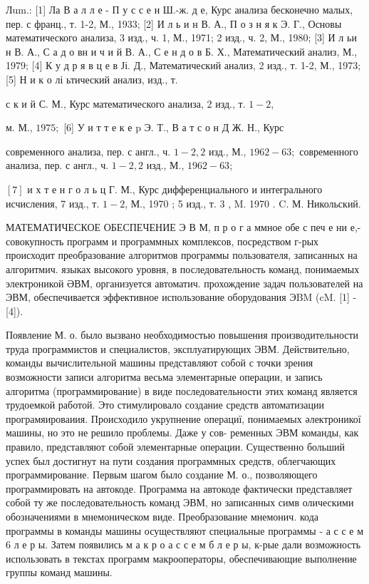 \documentclass[10pt]{article}
\begin{document}
Лum.: [1] Ла В а л л е - П у с с е н Ш.-ж. д е, Курс анализа бесконечно малых, пер. с франц., т. 1-2, М., 1933; [2] И л ь и н В. А., П о з н я к Э. Г., Основы математического анализа, 3 изд., ч. 1, М., 1971; 2 изд., ч. 2, М., 1980; [3] И л ьи н В. А., С а д о вн и ч и й В. А., С е н д о в Б. Х., Математический анализ, М., 1979; [4] К у д р я в ц е в Јі. Д., Математический анализ, 2 изд., т. 1-2, М., 1973; [5] Н и к о лі ьтический анализ, изд., т.

с к и й С. М., Курс математического анализа, 2 изд., т. $1-2$,

м. М., $1975 ;$ [6] У и т т е к е p Э. Т., В а т с о н Д Ж. Н., Курс

современного анализа, пер. с англ., ч. $1-2,2$ изд., М., $1962-63 ;$ современного анализа, пер. с англ., ч. $1-2,2$ изд., М., $1962-63$;

$[7]$ и х т е н г о л ь ц Г. М., Курс дифференциального и интегрального исчисления, 7 изд., т. $1-2$, М., 1970 ; 5 изд., т. 3 , M. 1970 . C. М. Никольский.



МАТЕМАТИЧЕСКОЕ ОБЕСПЕЧЕНИЕ Э В М, п р о г а ммное обе с печ е ни е,- совокупность программ и программных комплексов, посредством г-рых происходит преобразование алгоритмов программы пользователя, записанных на алгоритмич. языках высокого уровня, в последовательность команд, понимаемых электроникой ӘВМ, организуется автоматич. прохождение задач пользователей на ЭВМ, обеспечивается эффективное использование оборудования ЭBM (cM. [1] - [4]).



Появление М. о. было вызвано необходимостью повышения производительности труда программистов и специалистов, эксплуатирующих ЭВМ. Действительно, команды вычислительной машины представляют собой с точки зрения возможности записи алгоритма весьма элементарные операции, и запись алгоритма (программирование) в виде последовательности этих команд является трудоемкой работой. Это стимулировало создание средств автоматизации програмяироваиия. Происходило укрупнение операциї, понимаемых әлектроникої машины, но это не решило проблемы. Даже у сов- ременных ЭВМ команды, как правило, представляют собой элементарные операции. Существенно больший успех был достигнут на пути создания программных средств, облегчающих программирование. Первым шагом было создание М. о., позволяющего программировать на автокоде. Программа на автокоде фактически представляет собой ту же последовательность команд ЭВМ, но записанных симв олическими обозначениями в мнемоническом виде. Преобразование мнемонич. кода программы в команды машины осуществляют специальные программы - а с с е м 6 л е р ы. Затем появились м а к р о а с с е м б л е р ы, к-рые дали возможность использовать в текстах программ макрооператоры, обеспечивающие выполнение группы команд машины.
\end{document}
